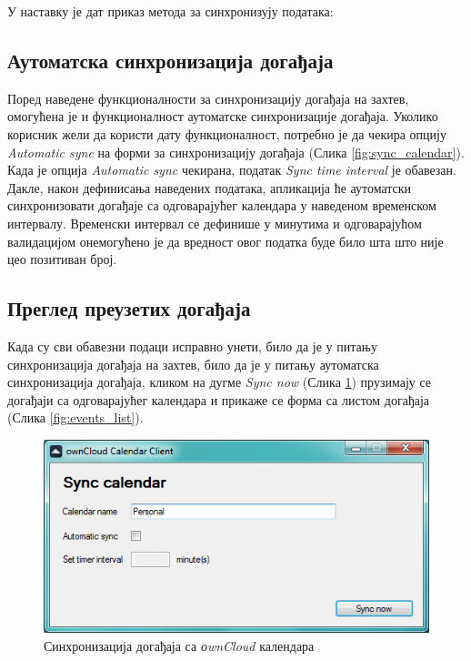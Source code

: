 У наставку је дат приказ метода за синхронизују података:


\subsection{Аутоматска синхронизација догађаја}

Поред наведене функционалности за синхронизацију догађаја на захтев, омогућена је и функционалност аутоматске синхронизације догађаја. Уколико корисник жели да користи дату функционалност, потребно је да чекира опцију \textit{Automatic sync} на форми за синхронизацију догађаја (Слика \ref{fig:sync_calendar}). Када је опција \textit{Automatic sync} чекирана, податак \textit{Sync time interval} је обавезан. Дакле, након дефинисања наведених података, апликација ће аутоматски синхронизовати догађаје са одговарајућег календара у наведеном временском интервалу. Временски интервал се дефинише у минутима и одговарајућом валидацијом онемогућено је да вредност овог податка буде било шта што није цео позитиван број.

\subsection{Преглед преузетих догађаја}
Када су сви обавезни подаци исправно унети, било да је у питању синхронизација догађаја на захтев, било да је у питању аутоматска синхронизација догађаја, кликом на дугме \textit{Sync now} (Слика \ref{fig:sync_calendar_personal}) прузимају се догађаји са одговарајућег календара и прикаже се форма са листом догађаја (Слика \ref{fig:events_list}).

\begin{figure}[H]
	\centering
	\includegraphics[scale=0.5]{slike/SyncCalendarPersonal.png}
	\caption{Синхронизација догађаја са \textit{оwnCloud} календара}
	\label{fig:sync_calendar_personal}
\end{figure}

